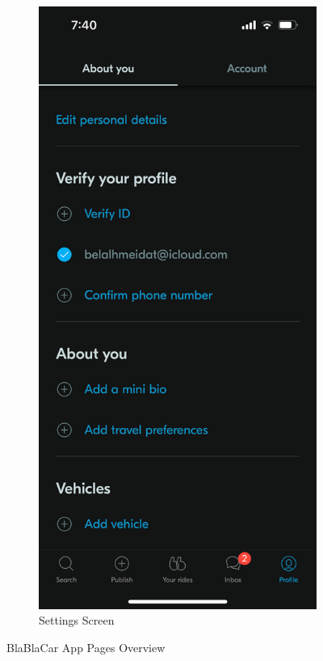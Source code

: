 \documentclass[a4paper, 12pt]{article} %
\begin{document}
\begin{figure}
\begin{subfigure}{0.3\textwidth}
                        \includegraphics[width=0.8\linewidth, height=0.9\textheight, keepaspectratio]{Images/Blablacar_settings.PNG}
                        \caption{Settings Screen}
                        \label{fig:blabla_settings}
                    \end{subfigure}
                    \caption{BlaBlaCar App Pages Overview \cite{blablacar_app}}
                    \label{fig:blabla_gallary}
                \end{figure}
                \pagebreak
\end{document}
